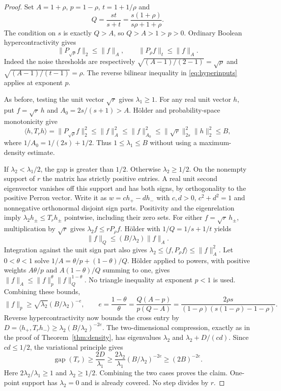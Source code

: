 \documentclass[11pt]{article}
\newcommand{\gap}{\operatorname{gap}}
\begin{document}
\begin{proof}
Set $A=1+\rho$, $p=1-\rho$, $t=1+1/\rho$ and
\[
 Q=\frac{st}{s+t}=\frac{s(1+\rho)}{s\rho+1+\rho}.
\]
The condition on $s$ is exactly $Q>A$, so $Q>A>1>p>0$.
Ordinary Boolean hypercontractivity gives
\[
 \|P_{\sqrt\rho}f\|_2\le\|f\|_A,
 \qquad \|P_\rho f\|_t\le\|f\|_A.
\]
Indeed the noise thresholds are respectively
$\sqrt{(A-1)/(2-1)}=\sqrt\rho$ and
$\sqrt{(A-1)/(t-1)}=\rho$. The reverse bilinear inequality in
\eqref{eq:hyperinputs} applies at exponent $p$.

As before, testing the unit vector $\sqrt r$ gives $\lambda_1\ge1$.
For any real unit vector $h$, put $f=\sqrt r\,h$ and
$A_0=2s/(s+1)>A$. H\"older and probability-space monotonicity give
\[
 \langle h,T_rh\rangle=\|P_{\sqrt\rho}f\|_2^2
 \le\|f\|_A^2\le\|f\|_{A_0}^2
 \le\|\sqrt r\|_{2s}^2\|h\|_2^2\le B,
\]
where $1/A_0=1/(2s)+1/2$. Thus $1\le\lambda_1\le B$ without
using a maximum-density estimate.

If $\lambda_2<\lambda_1/2$, the gap is greater than $1/2$.
Otherwise $\lambda_2\ge1/2$. On the nonempty support of $r$ the matrix
has strictly positive entries. A real unit second eigenvector vanishes
off this support and has both signs, by orthogonality to the positive
Perron vector. Write it as $w=c h_+-d h_-$ with $c,d>0$,
$c^2+d^2=1$ and nonnegative orthonormal disjoint sign parts.
Positivity and the eigenrelation imply
$\lambda_2h_\pm\le T_rh_\pm$ pointwise, including their zero sets.
For either $f=\sqrt r\,h_\pm$, multiplication by $\sqrt r$ gives
$\lambda_2f\le rP_\rho f$. H\"older with $1/Q=1/s+1/t$ yields
\[
 \|f\|_Q\le (B/\lambda_2)\|f\|_A.
\]
Integration against the unit sign part also gives
$\lambda_2\le\langle f,P_\rho f\rangle\le\|f\|_A^2$.
Let $0<\theta<1$ solve $1/A=\theta/p+(1-\theta)/Q$.
H\"older applied to powers, with positive weights
$A\theta/p$ and $A(1-\theta)/Q$ summing to one, gives
$\|f\|_A\le\|f\|_p^\theta\|f\|_Q^{1-\theta}$.
No triangle inequality at exponent $p<1$ is used. Combining these bounds,
\[
 \|f\|_p\ge\sqrt{\lambda_2}(B/\lambda_2)^{-e},\qquad
 e=\frac{1-\theta}{\theta}
   =\frac{Q(A-p)}{p(Q-A)}
   =\frac{2\rho s}{(1-\rho)(s(1-\rho)-1-\rho)}.
\]
Reverse hypercontractivity now bounds the cross entry by
$D=\langle h_+,T_rh_-\rangle\ge\lambda_2(B/\lambda_2)^{-2e}$.
The two-dimensional compression, exactly as in the proof of
Theorem~\ref{thm:density}, has eigenvalues $\lambda_2$ and
$\lambda_2+D/(cd)$. Since $cd\le1/2$, the variational principle gives
\[
 \gap(T_r)\ge\frac{2D}{\lambda_1}
 \ge\frac{2\lambda_2}{\lambda_1}(B/\lambda_2)^{-2e}
 \ge(2B)^{-2e}.
\]
Here $2\lambda_2/\lambda_1\ge1$ and $\lambda_2\ge1/2$.
Combining the two cases proves the claim. One-point support has
$\lambda_2=0$ and is already covered. No step divides by $r$.
\end{proof}
\end{document}
